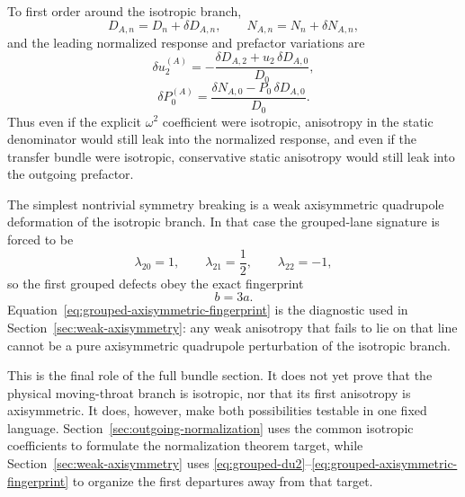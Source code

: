 \documentclass[11pt]{article}
\theoremstyle{definition}
\begin{document}
To first order around the isotropic branch,
\begin{equation}
D_{A,n}=D_n+\delta D_{A,n},
\qquad
N_{A,n}=N_n+\delta N_{A,n},
\label{eq:grouped-first-order-perturbations}
\end{equation}
and the leading normalized response and prefactor variations are
\begin{equation}
\delta u_2^{(A)}=-\frac{\delta D_{A,2}+u_2\,\delta D_{A,0}}{D_0},
\label{eq:grouped-du2}
\end{equation}
\begin{equation}
\delta P_0^{(A)}=\frac{\delta N_{A,0}-P_0\,\delta D_{A,0}}{D_0}.
\label{eq:grouped-dP0}
\end{equation}
Thus even if the explicit $\omega^2$ coefficient were isotropic, anisotropy in the static denominator would still leak into the normalized response, and even if the transfer bundle were isotropic, conservative static anisotropy would still leak into the outgoing prefactor.

The simplest nontrivial symmetry breaking is a weak axisymmetric quadrupole deformation of the isotropic branch. In that case the grouped-lane signature is forced to be
\begin{equation}
\lambda_{20}=1,
\qquad
\lambda_{21}=\frac12,
\qquad
\lambda_{22}=-1,
\label{eq:grouped-axisymmetric-signature}
\end{equation}
so the first grouped defects obey the exact fingerprint
\begin{equation}
 b=3a.
\label{eq:grouped-axisymmetric-fingerprint}
\end{equation}
Equation~\eqref{eq:grouped-axisymmetric-fingerprint} is the diagnostic used in Section~\ref{sec:weak-axisymmetry}: any weak anisotropy that fails to lie on that line cannot be a pure axisymmetric quadrupole perturbation of the isotropic branch.

This is the final role of the full bundle section. It does not yet prove that the physical moving-throat branch is isotropic, nor that its first anisotropy is axisymmetric. It does, however, make both possibilities testable in one fixed language. Section~\ref{sec:outgoing-normalization} uses the common isotropic coefficients to formulate the normalization theorem target, while Section~\ref{sec:weak-axisymmetry} uses \eqref{eq:grouped-du2}--\eqref{eq:grouped-axisymmetric-fingerprint} to organize the first departures away from that target.

\end{document}
